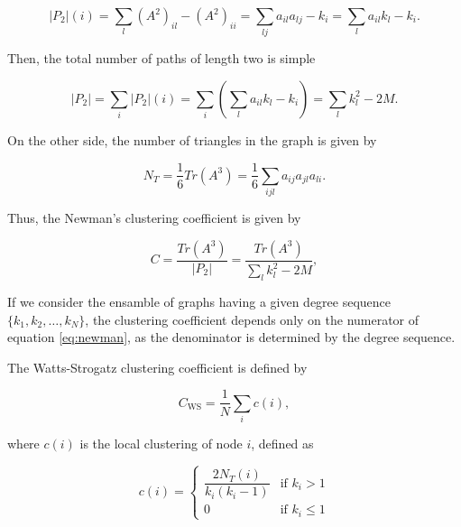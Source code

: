 \documentclass{article}
\begin{document}
\begin{equation}
    |P_2|(i) = \sum_{l} (A^2)_{il} - (A^2)_{ii}=  \sum_{lj} a_{il} a_{lj} - k_i = \sum_{l} a_{il} k_l - k_i.
\end{equation}

Then, the total number of paths of length two is simple 

\begin{equation} \label{eq:P2}
    |P_2| = \sum_i |P_2|(i) = \sum_i \left( \sum_{l} a_{il} k_l - k_i \right) = \sum_l k_l^2 - 2M.
\end{equation}

On the other side, the number of triangles in the graph is given by

\begin{equation} \label{eq:T}
    N_T = \dfrac{1}{6} Tr(A^3) = \dfrac{1}{6} \sum_{ijl} a_{ij} a_{jl} a_{li}.
\end{equation}

Thus, the Newman's clustering coefficient is given by

\begin{equation} \label{eq:newman}
    C = \dfrac{Tr(A^3)}{|P_2|} = \dfrac{Tr(A^3)}{\sum_l k_l^2 - 2M},
\end{equation}

If we consider the ensamble of graphs having a given degree sequence $\lbrace k_1, k_2, \dots, k_N\rbrace$, the clustering coefficient depends only on the numerator of equation \ref{eq:newman}, as the denominator is determined by the degree sequence.

The Watts-Strogatz clustering coefficient is defined by

\begin{equation} \label{eq:ws}
    C_{\mathrm{WS}} = \dfrac{1}{N} \sum_{i} c(i),
\end{equation}

where $c(i)$ is the local clustering of node $i$, defined as

\begin{equation}
    c(i) = 
    \left\{
    	\begin{array}{ll}
    		\dfrac{2 N_{T}(i)}{k_i (k_i-1)}  & \mbox{if } k_i > 1 \\
    		0 & \mbox{if } k_i \leq 1
    	\end{array}
    \right.
\end{equation}
\end{document}
